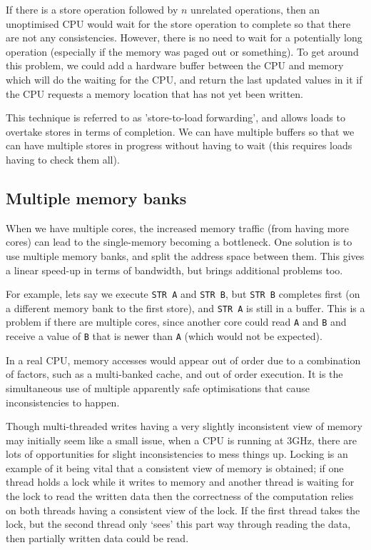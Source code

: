 If there is a store operation followed by $n$ unrelated operations,
then an unoptimised CPU would wait for the store operation to complete
so that there are not any consistencies. However, there is no need to
wait for a potentially long operation (especially if the memory was
paged out or something). To get around this problem, we could add a
hardware buffer between the CPU and memory which will do the waiting
for the CPU, and return the last updated values in it if the CPU
requests a memory location that has not yet been written.

This technique is referred to as 'store-to-load forwarding', and
allows loads to overtake stores in terms of completion. We can have
multiple buffers so that we can have multiple stores in progress
without having to wait (this requires loads having to check them all).

\subsection{Multiple memory banks}

When we have multiple cores, the increased memory traffic (from having
more cores) can lead to the single-memory becoming a bottleneck. One
solution is to use multiple memory banks, and split the address space
between them. This gives a linear speed-up in terms of bandwidth, but
brings additional problems too.

For example, lets say we execute \texttt{STR A} and \texttt{STR B},
but \texttt{STR B} completes first (on a different memory bank to the
first store), and \texttt{STR A} is still in a buffer. This is a
problem if there are multiple cores, since another core could
read \texttt{A} and \texttt{B} and receive a value of \texttt{B} that
is newer than \texttt{A} (which would not be expected).

In a real CPU, memory accesses would appear out of order due to a
combination of factors, such as a multi-banked cache, and out of order
execution. It is the simultaneous use of multiple apparently safe
optimisations that cause inconsistencies to happen.

Though multi-threaded writes having a very slightly inconsistent view
of memory may initially seem like a small issue, when a CPU is running
at $3\si{\giga\hertz}$, there are lots of opportunities for slight
inconsistencies to mess things up. Locking is an example of it being
vital that a consistent view of memory is obtained; if one thread
holds a lock while it writes to memory and another thread is waiting
for the lock to read the written data then the correctness of the
computation relies on both threads having a consistent view of the
lock. If the first thread takes the lock, but the second thread only
`sees' this part way through reading the data, then partially written
data could be read.

